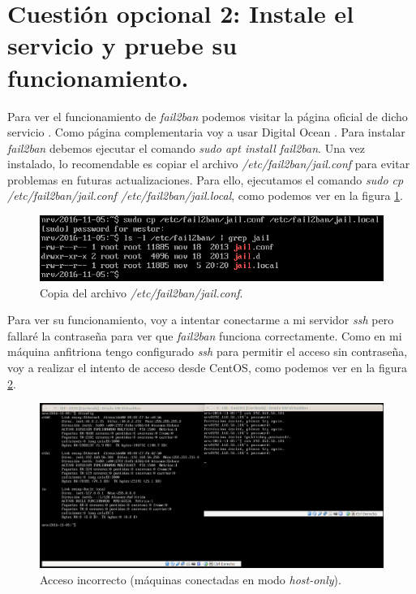 \documentclass[a4paper,titlepage,12pt]{scrartcl}	%
\numberwithin{figure}{section} %
\numberwithin{table}{section} %
\begin{document}
	\section[Cuestión opcional 2: Instale el servicio y pruebe su funcionamiento.]{Cuestión opcional 2: Instale el servicio y pruebe su funcionamiento.}
	
	Para ver el funcionamiento de \textit{fail2ban} podemos visitar la página oficial de dicho servicio \cite{fail2ban}. Como página complementaria voy a usar Digital Ocean \cite{fail2bandigitalocean}. Para instalar \textit{fail2ban} debemos ejecutar el comando \textit{sudo apt install fail2ban}. Una vez instalado, lo recomendable es copiar el archivo \textit{/etc/fail2ban/jail.conf} para evitar problemas en futuras actualizaciones. Para ello, ejecutamos el comando \textit{sudo cp /etc/fail2ban/jail.conf /etc/fail2ban/jail.local}, como podemos ver en la figura \ref{O2-copiarjail}.
	\begin{figure}[H]
		\centering
		\includegraphics[scale=0.53]{./Imagenes/O2-copiarjail.png}
		\caption[Copia del archivo \textit{/etc/fail2ban/jail.conf}.]{Copia del archivo \textit{/etc/fail2ban/jail.conf}.}
		\label{O2-copiarjail}
	\end{figure}
	
	Para ver su funcionamiento, voy a intentar conectarme a mi servidor \textit{ssh} pero fallaré la contraseña para ver que \textit{fail2ban} funciona correctamente. Como en mi máquina anfitriona tengo configurado \textit{ssh} para permitir el acceso sin contraseña, voy a realizar el intento de acceso desde CentOS, como podemos ver en la figura \ref{O2-accesomal}.
	\begin{figure}[H]
		\includegraphics[width=\linewidth]{./Imagenes/O2-accesomal.png}
		\vspace{-0.5cm}
		\caption[Acceso incorrecto (máquinas conectadas en modo \textit{host-only}).]{Acceso incorrecto (máquinas conectadas en modo \textit{host-only}).}
		\label{O2-accesomal}
	\end{figure}
	
\end{document}
